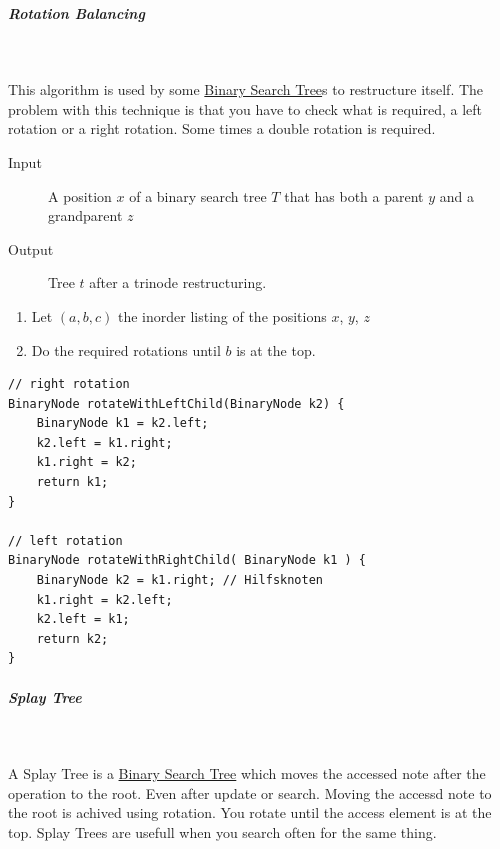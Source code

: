 \documentclass[11pt,twoside,twocolumn,landscape]{article}
\begin{document}
\subparagraph{Rotation Balancing} \
\label{sec:orgf20f31c}

This algorithm is used by some \href{../../../roam/20211008140953-binary_search_tree.org}{Binary Search Tree}s to restructure itself.
The problem with this technique is that you have to check what is required, a left rotation or a right rotation.
Some times a double rotation is required. 


\begin{description}
\item[{Input}] A position \(x\) of a binary search tree \(T\) that has both a parent \(y\) and a grandparent \(z\)
\item[{Output}] Tree \(t\) after a trinode restructuring.
\end{description}


\begin{enumerate}
\item Let \((a, b, c)\) the inorder listing of the positions \(x\), \(y\), \(z\)
\item Do the required rotations until \(b\) is at the top.
\end{enumerate}


\lstset{language=java,label= ,caption= ,captionpos=b,numbers=none}
\begin{lstlisting}
// right rotation
BinaryNode rotateWithLeftChild(BinaryNode k2) {
    BinaryNode k1 = k2.left;
    k2.left = k1.right;
    k1.right = k2;
    return k1;
}

// left rotation
BinaryNode rotateWithRightChild( BinaryNode k1 ) {
    BinaryNode k2 = k1.right; // Hilfsknoten
    k1.right = k2.left;
    k2.left = k1;
    return k2;
}
\end{lstlisting}



\subparagraph{Splay Tree} \
\label{sec:org86231c2}

A Splay Tree is a \href{../../../roam/20211008140953-binary_search_tree.org}{Binary Search Tree} which moves the accessed note after the operation to the root.
Even after update or search.
Moving the accessd note to the root is achived using rotation.
You rotate until the access element is at the top.
Splay Trees are usefull when you search often for the same thing.
\end{document}
